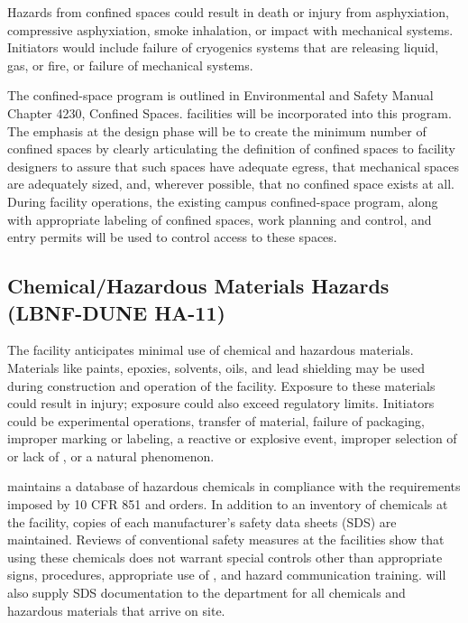 Hazards from confined spaces could result in death or injury from
asphyxiation, compressive asphyxiation, smoke inhalation, or impact
with mechanical systems. Initiators would include failure of cryogenics
systems that are releasing liquid, gas, or fire, or failure of mechanical
systems. 

The \fnal confined-space program is outlined in \fnal Environmental
and Safety Manual Chapter 4230, Confined
Spaces.  facilities will be incorporated into
this program. The emphasis at the  design
phase will be to create the minimum number of confined spaces by
clearly articulating the definition of confined spaces to facility
designers to assure that such spaces have adequate egress, that mechanical
spaces are adequately sized, and, wherever possible, that no confined space
exists at all. During facility operations, the existing campus
confined-space program, along with appropriate labeling of confined
spaces, work planning and control, and entry permits will be used to
control access to these spaces.

\subsection{Chemical/Hazardous Materials Hazards (LBNF-DUNE HA-11)}

The  facility anticipates minimal use of chemical and hazardous
materials. Materials like paints, epoxies, solvents, oils, and lead
shielding may be used during construction and operation of the
facility. Exposure to these materials could result in injury;
exposure could also exceed regulatory limits. Initiators could be
experimental operations, transfer of material, failure of packaging,
improper marking or labeling, a reactive or explosive event, improper
selection of or lack of , or a
natural phenomenon.

\fnal maintains a database of hazardous chemicals in compliance with
the requirements imposed by 10 CFR 851 and  orders. In
addition to an inventory of chemicals at the facility, copies of each
manufacturer's safety data sheets (SDS) are maintained. Reviews of
conventional safety measures at the facilities show that using these
chemicals does not warrant special controls other than appropriate
signs, procedures, appropriate use of  ,
and hazard communication training.  will also supply
SDS documentation to the  
department for all chemicals and hazardous materials that arrive on
site.

